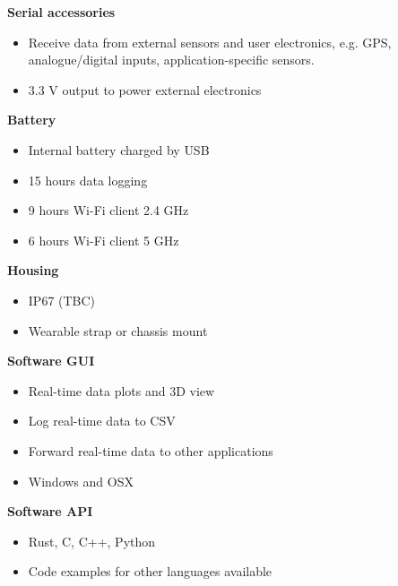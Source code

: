 \begin{multicols}{2}
\textbf{Serial accessories}
\begin{itemize}[nolistsep]
    \item Receive data from external sensors and user electronics, e.g. \acs{GPS}, analogue/digital inputs, application-specific sensors.
    \item 3.3 V output to power external electronics
\end{itemize}

\textbf{Battery}
\begin{itemize}[nolistsep]
    \item Internal battery charged by \acs{USB}
    \item 15 hours data logging
    \item 9 hours Wi-Fi client 2.4 GHz
    \item 6 hours Wi-Fi client 5 GHz
\end{itemize}

\textbf{Housing}
\begin{itemize}[nolistsep]
    \item IP67 (TBC)
    \item Wearable strap or chassis mount
\end{itemize}

\textbf{Software \acs{GUI}}
\begin{itemize}[nolistsep]
    \item Real-time data plots and 3D view
    \item Log real-time data to \acs{CSV}
    \item Forward real-time data to other applications
    \item Windows and OSX
\end{itemize}

\textbf{Software \acs{API}}
\begin{itemize}[nolistsep]
    \item Rust, C, C++, Python
    \item Code examples for other languages available
\end{itemize}

\end{multicols}

\clearpage
